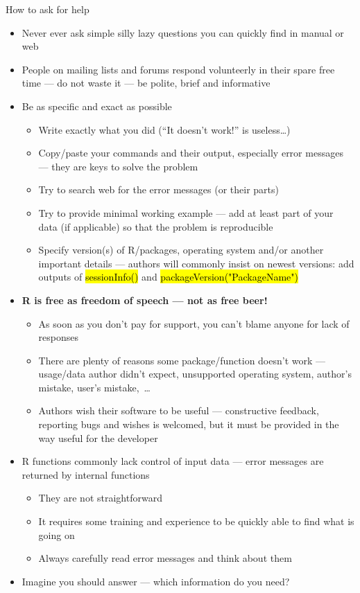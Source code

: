 \documentclass[compress, ucs, xelatex, 11pt, xcolor=svgnames,
  hyperref={
    bookmarks=true,
    unicode=true,
    colorlinks=true,
    pdftitle={Molecular data in R},
    plainpages=false,
    pdfauthor={Vojtech Zeisek},
    pdfsubject={Course about phylogeny and evolution in R},
    pdfcreator={XeLaTeX},
    pdfkeywords={R, evolution, phylogeny, molecular data},
    linkcolor=Tomato,
    anchorcolor=SaddleBrown,
    citecolor=Goldenrod,
    filecolor=DarkMagenta,
    menucolor=Sienna,
    urlcolor=DarkTurquoise,
    pdftex},
  url={hyphens, lowtilde} %
  ]{beamer}
\renewcommand{\texttt}[1]{\hl{\ttfamily #1}}
\begin{document}
\begin{frame}[allowframebreaks]{How to ask for help}
  \label{howtoask}
  \begin{itemize}
    \item \alert{Never ever} ask simple silly lazy questions you can quickly find in manual or web
    \item People on mailing lists and forums respond volunteerly in their spare free time --- do not waste it --- be polite, brief and informative
    \item Be as specific and exact as possible
    \begin{itemize}
      \item Write \alert{exactly} what you did (``It doesn't work!'' is useless\ldots)
      \item Copy/paste your commands and their output, especially error messages --- they are keys to solve the problem
      \item Try to search web for the error messages (or their parts)
      \item Try to provide minimal working example --- add at least part of your data (if applicable) so that the problem is reproducible
      \item Specify version(s) of R/packages, operating system and/or another important details --- authors will commonly insist on newest versions: add outputs of \texttt{sessionInfo()} and \texttt{packageVersion("PackageName")}
    \end{itemize}
    \item \textbf{R is free as freedom of speech --- not as free beer!}
    \begin{itemize}
      \item As soon as you don't pay for support, you can't blame anyone for lack of responses
      \item There are plenty of reasons some package/function doesn't work --- usage/data author didn't expect, unsupported operating system, author's mistake, user's mistake,~\ldots
      \item Authors wish their software to be useful --- constructive feedback, reporting bugs and wishes is welcomed, but it must be provided in the way useful for the developer
    \end{itemize}
    \item R functions commonly lack control of input data --- error messages are returned by internal functions
    \begin{itemize}
      \item They are not straightforward
      \item It requires some training and experience to be quickly able to find what is going on
      \item Always carefully read error messages and think about them
    \end{itemize}
    \item Imagine you should answer --- which information do you need?
  \end{itemize}
\end{frame}
\end{document}
